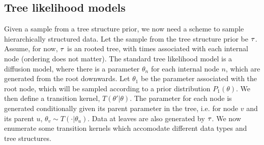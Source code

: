 \subsection{Tree likelihood models}

Given a sample from a tree structure prior, 
we now need a scheme to sample
hierarchically structured data.
Let the sample from the tree
structure prior be $\tau$.
Assume, for now, $\tau$ is
an rooted tree,
with times associated with each internal node (ordering does not matter).
The standard tree likelihood model is a diffusion model,
where there is a parameter $\theta_n$ for each internal
node $n$, which are generated from the root downwards.
Let $\theta_1$ be the parameter associated with the root node,
which will be sampled according to a prior distribution $P_1(\theta)$.
We then define a transition kernel, $T(\theta' | \theta)$.
The parameter for each node is generated conditionally
given its parent parameter in the tree,
i.e. for node $v$ and its parent $u$,
$\theta_v \sim T(\cdot | \theta_u)$.
Data at leaves are also generated by $\tau$.
We now enumerate some transition kernels
which accomodate different data types and tree structures.

